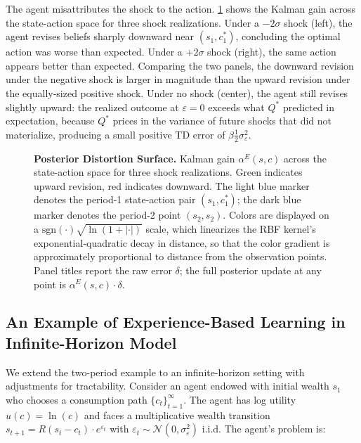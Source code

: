 The agent misattributes the shock to the action. \ref{fig:update_surface} shows the Kalman
gain across the state-action space for three shock realizations. Under a $-2\sigma$ shock (left), the
agent revises beliefs sharply downward near $(s_1, c_1^*)$, concluding the optimal action was
worse than expected. Under a $+2\sigma$ shock (right), the same action appears better than
expected. Comparing the two panels, the downward revision under the negative shock is larger in
magnitude than the upward revision under the equally-sized positive shock. Under no shock (center), the agent
still revises slightly upward: the realized outcome at $\varepsilon = 0$ exceeds what $Q^*$
predicted in expectation, because $Q^*$ prices in the variance of future shocks that did not
materialize, producing a small positive TD error of $\beta \tfrac{1}{2}\sigma_\varepsilon^2$.

\begin{figure} \label{fig:update_surface}
\centering
\resizebox{\textwidth}{!}{}
\caption[Posterior Distortion Surface]{
  \textbf{Posterior Distortion Surface.} Kalman gain $\alpha^E(s,c)$ across the state-action space for three shock realizations.
  Green indicates upward revision, red indicates downward. The light blue marker denotes the
  period-1 state-action pair $(s_1, c_1^*)$; the dark blue marker denotes the period-2
  point $(s_2, s_2)$. Colors are displayed on a $\mathrm{sgn}(\cdot)\sqrt{\ln(1+|\cdot|)}$ scale,
  which linearizes the RBF kernel's exponential-quadratic decay in distance, so that the color
  gradient is approximately proportional to distance from the observation points. Panel
  titles report the raw error $\delta$; the full posterior update at any point is
  $\alpha^E(s,c) \cdot \delta$.}
\end{figure}

\subsection{An Example of Experience-Based Learning in Infinite-Horizon Model} \label{app:infinite_horizon_example}

We extend the two-period example to an infinite-horizon setting with adjustments for
tractability. Consider an agent endowed with initial wealth $s_1$ who chooses a consumption
path $\{c_t\}_{t=1}^\infty$. The agent has log utility $u(c) = \ln(c)$ and faces a multiplicative
wealth transition $s_{t+1} = R(s_t - c_t) \cdot e^{\varepsilon_t}$ with $\varepsilon_t \sim
\mathcal{N}(0, \sigma_\varepsilon^2)$ i.i.d. The agent's problem is:

